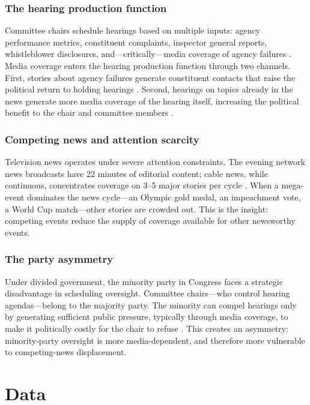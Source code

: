 \documentclass[12pt]{article}
\begin{document}
\subsubsection*{The hearing production function} Committee chairs schedule hearings based on multiple inputs: agency performance metrics, constituent complaints, inspector general reports, whistleblower disclosures, and---critically---media coverage of agency failures \citep{baumgartner2006agendas}. Media coverage enters the hearing production function through two channels. First, stories about agency failures generate constituent contacts that raise the political return to holding hearings \citep{arnold1990logic}. Second, hearings on topics already in the news generate more media coverage of the hearing itself, increasing the political benefit to the chair and committee members \citep{graber2009mass}.

\subsubsection*{Competing news and attention scarcity} Television news operates under severe attention constraints. The evening network news broadcasts have 22 minutes of editorial content; cable news, while continuous, concentrates coverage on 3--5 major stories per cycle \citep{hamilton2004all}. When a mega-event dominates the news cycle---an Olympic gold medal, an impeachment vote, a World Cup match---other stories are crowded out. This is the \citet{eisensee2007news} insight: competing events reduce the supply of coverage available for other newsworthy events.

\subsubsection*{The party asymmetry} Under divided government, the minority party in Congress faces a strategic disadvantage in scheduling oversight. Committee chairs---who control hearing agendas---belong to the majority party. The minority can compel hearings only by generating sufficient public pressure, typically through media coverage, to make it politically costly for the chair to refuse \citep{kriner2014investigating}. This creates an asymmetry: minority-party oversight is more media-dependent, and therefore more vulnerable to competing-news displacement.


\section{Data}
\label{sec:data}
\end{document}
